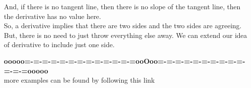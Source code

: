 \documentclass{ximera}
\begin{document}
And, if there is no tangent line, then there is no slope of the tangent line, then the derivative has no value here. \\







So, a derivative implies that there are two sides and the two sides are agreeing. \\



But, there is no need to just throw everything else away.  We can extend our idea of derivative to include just one side. \\ 





































\begin{center}
\textbf{\textcolor{green!50!black}{ooooo=-=-=-=-=-=-=-=-=-=-=-=-=ooOoo=-=-=-=-=-=-=-=-=-=-=-=-=ooooo}} \\

more examples can be found by following this link\\ 

\end{center}
\end{document}
